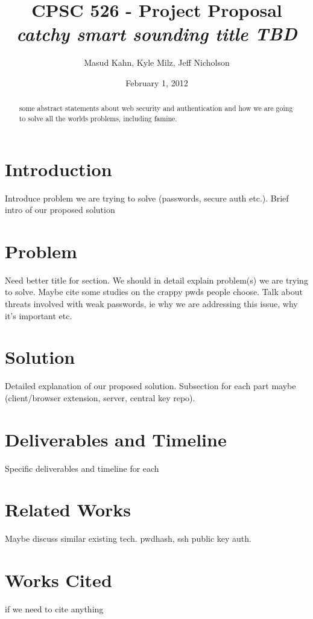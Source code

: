 \documentclass[11pt]{article}   %
\begin{document}
\title{\bf CPSC 526 - Project Proposal \\ \emph{catchy smart sounding title TBD}}   %
\author{Masud Kahn, Kyle Milz, Jeff Nicholson}         %
\date{February 1, 2012}    %
\maketitle

\tableofcontents
\pagebreak
\begin{abstract}
some abstract statements about web security and authentication and how we are going to solve all the worlds problems, including famine.
\end{abstract}
\pagebreak
\section{Introduction}
Introduce problem we are trying to solve (passwords, secure auth etc.). Brief intro of our proposed solution

\section{Problem}
Need better title for section. We should in detail explain problem(s) we are trying to solve. Maybe cite some studies on the crappy pwds people choose. Talk about threats involved with weak passwords, ie why we are addressing this issue, why it's important etc.

\section{Solution}
Detailed explanation of our proposed solution. Subsection for each part maybe (client/browser extension, server, central key repo).

\section{Deliverables and Timeline}
Specific deliverables and timeline for each


\section{Related Works}
Maybe discuss similar existing tech. pwdhash, ssh public key auth.

\section{Works Cited}
if we need to cite anything
\end{document}
